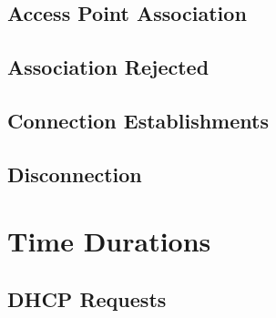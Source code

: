 


\subsection{Access Point Association}

\subsection{Association Rejected}


\subsection{Connection Establishments}

\subsection{Disconnection}




\section{Time Durations}
\subsection{DHCP Requests}



